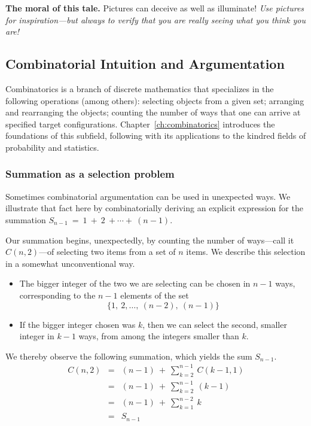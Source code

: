 \bigskip

\noindent
{\bf The moral of this tale.}  Pictures can deceive as well as illuminate!  {\em Use pictures for inspiration---but always to verify that you are really seeing what you think you are!}


\subsection{Combinatorial Intuition and Argumentation}
\label{sec:comb-proofs}

Combinatorics is a branch of discrete mathematics that specializes in the following operations (among others): selecting objects from a given set; arranging and rearranging the objects; counting the number of ways that one can arrive at specified target configurations.
Chapter~\ref{ch:combinatorics} introduces the foundations of this subfield, following with its applications to the kindred fields of probability and statistics.

\subsubsection{Summation as a selection problem}
\label{sec:comb-sum-of-first-n}

Sometimes combinatorial argumentation can be used in unexpected ways.  We illustrate that fact here by combinatorially deriving an explicit expression for the summation
$S_{n-1} \  = \ 1 \ + \ 2 \ + \cdots + \ (n-1)$.

\smallskip

Our summation begins, unexpectedly, by counting the number of ways---call it $C(n,2)$---of selecting two items from a set of $n$ items.  We describe this selection in a somewhat unconventional way.
\begin{itemize}
\item
The bigger integer of the two we are selecting can be chosen in $n-1$ ways, corresponding to the $n-1$ elements of the set
\[ \{ 1, \ 2, \ldots, \ (n-2), \ (n-1) \} \]
\item
If the bigger integer chosen was $k$, then we can select the second, smaller integer in $k-1$ ways, from among the integers smaller than $k$.
\end{itemize}
We thereby observe the following summation, which yields the sum $S_{n-1}$.
\begin{eqnarray*}
C(n,2) & = & (n-1) \ + \ \sum_{k=2}^{n-1} \ C(k-1,1) \\
       & = & (n-1) \ + \ \sum_{k=2}^{n-1} \ (k-1) \\
       & = & (n-1) \ + \ \sum_{k=1}^{n-2} \ k \\
       & = & S_{n-1}
\end{eqnarray*}

